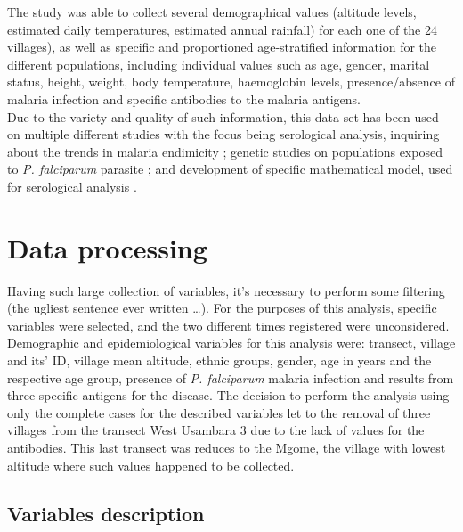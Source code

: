The study was able to collect several demographical values (altitude levels, estimated daily temperatures, estimated annual rainfall) for each one of the 24 villages), as well as specific and proportioned age-stratified information for the different populations, including individual values such as age, gender, marital status, height, weight, body temperature, haemoglobin levels, presence/absence of malaria infection and specific antibodies to the malaria antigens.\\
Due to the variety and quality of such information, this data set has been used on multiple different studies with the focus being serological analysis, inquiring about the trends in malaria endimicity \cite{drakeley2005estimating}; genetic studies on populations exposed to \textit{P. falciparum} parasite \cite{enevold2007associations,sepulveda2017malaria}; and development of specific mathematical model, used for serological analysis \cite{bosomprah2014mathematical}.

\section{Data processing}

Having such large collection of variables, it's necessary to perform some filtering (the ugliest sentence ever written \dots). For the purposes of this analysis, specific variables were selected, and the two different times registered were unconsidered.\\
Demographic and epidemiological variables for this analysis were: transect, village and its' ID, village mean altitude, ethnic groups, gender, age in years and the respective age group, presence of \textit{P. falciparum} malaria infection and results from three specific antigens for the disease. The decision to perform the analysis using only the complete cases for the described variables let to the removal of three villages from the transect West Usambara 3 due to the lack of values for the antibodies. This last transect was reduces to the Mgome, the village with lowest altitude where such values happened to be collected.
 
\subsection{Variables description}


